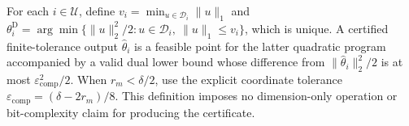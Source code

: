 For each \(i\in\mathcal U\), define \(v_i=\min_{u\in\mathcal D_i}\lVert u\rVert_1\) and \(\theta_i^{\mathrm D}=\arg\min\{\lVert u\rVert_2^2/2:u\in\mathcal D_i,\ \lVert u\rVert_1\le v_i\}\), which is unique. A certified finite-tolerance output \(\widehat\theta_i\) is a feasible point for the latter quadratic program accompanied by a valid dual lower bound whose difference from \(\lVert\widehat\theta_i\rVert_2^2/2\) is at most \(\varepsilon_{\mathrm{comp}}^2/2\). When \(r_m<\delta/2\), use the explicit coordinate tolerance \(\varepsilon_{\mathrm{comp}}=(\delta-2r_m)/8\). This definition imposes no dimension-only operation or bit-complexity claim for producing the certificate.
